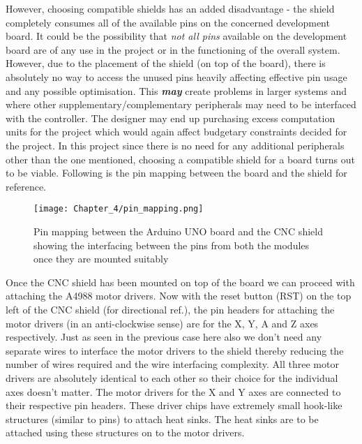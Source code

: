However, choosing compatible shields has an added disadvantage - the shield completely consumes all of the available pins on the concerned development board. It could be the possibility that \textit{not all pins} available on the development board are of any use in the project or in the functioning of the overall system. However, due to the placement of the shield (on top of the board), there is absolutely no way to access the unused pins heavily affecting effective pin usage and any possible optimisation. This \textbf{\textit{may}} create problems in larger systems and where other supplementary/complementary peripherals may need to be interfaced with the controller. The designer may end up purchasing excess computation units for the project which would again affect budgetary constraints decided for the project.  In this project since there is no need for any additional peripherals other than the one mentioned, choosing a compatible shield for a board turns out to be viable. Following is the pin mapping between the board and the shield for reference. \cite{online_interface_guide} \par

\begin{figure}[h]
 \centering
 \texttt{[image: Chapter\_4/pin\_mapping.png]}
 \caption{Pin mapping between the Arduino UNO board and the CNC shield showing the interfacing between the pins from both the modules once they are mounted suitably}
 \label{fig:pin_map}
\end{figure}


Once the CNC shield has been mounted on top of the board we can proceed with attaching the A4988 motor drivers. Now with the reset button (RST) on the top left of the CNC shield (for directional ref.), the pin headers for attaching the motor drivers (in an anti-clockwise sense) are for the X, Y, A and Z axes respectively. Just as seen in the previous case here also we don’t need any separate wires to interface the motor drivers to the shield thereby reducing the number of wires required and the wire interfacing complexity. All three motor drivers are absolutely identical to each other so their choice for the individual axes doesn’t matter. The motor drivers for the X and Y axes are connected to their respective pin headers. These driver chips have extremely small hook-like structures (similar to pins) to attach heat sinks. The heat sinks are to be attached using these structures on to the motor drivers. \par

